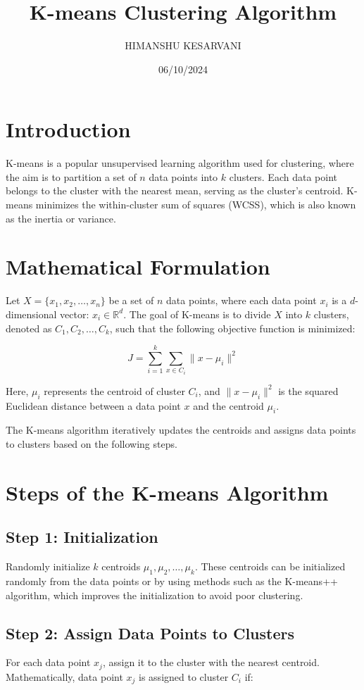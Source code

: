 \documentclass{article}
\title{K-means Clustering Algorithm}
\author{HIMANSHU KESARVANI}
\date{06/10/2024}
\begin{document}
\maketitle

\section{Introduction}
K-means is a popular unsupervised learning algorithm used for clustering, where the aim is to partition a set of $n$ data points into $k$ clusters. Each data point belongs to the cluster with the nearest mean, serving as the cluster's centroid. K-means minimizes the within-cluster sum of squares (WCSS), which is also known as the inertia or variance.

\section{Mathematical Formulation}

Let $X = \{x_1, x_2, \dots, x_n\}$ be a set of $n$ data points, where each data point $x_i$ is a $d$-dimensional vector: $x_i \in \mathbb{R}^d$. The goal of K-means is to divide $X$ into $k$ clusters, denoted as $C_1, C_2, \dots, C_k$, such that the following objective function is minimized:

\[
J = \sum_{i=1}^{k} \sum_{x \in C_i} \|x - \mu_i\|^2
\]

Here, $\mu_i$ represents the centroid of cluster $C_i$, and $\|x - \mu_i\|^2$ is the squared Euclidean distance between a data point $x$ and the centroid $\mu_i$.

The K-means algorithm iteratively updates the centroids and assigns data points to clusters based on the following steps.

\section{Steps of the K-means Algorithm}

\subsection{Step 1: Initialization}
Randomly initialize $k$ centroids $\mu_1, \mu_2, \dots, \mu_k$. These centroids can be initialized randomly from the data points or by using methods such as the K-means++ algorithm, which improves the initialization to avoid poor clustering.

\subsection{Step 2: Assign Data Points to Clusters}
For each data point $x_j$, assign it to the cluster with the nearest centroid. Mathematically, data point $x_j$ is assigned to cluster $C_i$ if:
\end{document}
